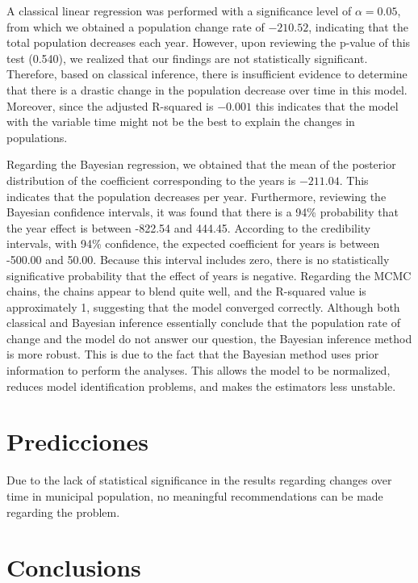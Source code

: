 \documentclass{article}
\begin{document}
A classical linear regression was performed with a significance level of $\alpha = 0.05$, from which we obtained a population change rate of $-210.52$, indicating that the total population decreases each year. However, upon reviewing the p-value of this test (0.540), we realized that our findings are not statistically significant. Therefore, based on classical inference, there is insufficient evidence to determine that there is a drastic change in the population decrease over time in this model. Moreover, since the adjusted R-squared is $-0.001$ this indicates that the model with the variable time might not be the best to explain the changes in populations.

Regarding the Bayesian regression, we obtained that the mean of the posterior distribution of the coefficient corresponding to the years is $-211.04$. This indicates that the population decreases per year. Furthermore, reviewing the Bayesian confidence intervals, it was found that there is a 94\% probability that the year effect is between -822.54 and 444.45. According to the credibility intervals, with 94\% confidence, the expected coefficient for years is between -500.00 and 50.00. Because this interval includes zero, there is no statistically significative probability that the effect of years is negative. Regarding the MCMC chains, the chains appear to blend quite well, and the R-squared value is approximately 1, suggesting that the model converged correctly. Although both classical and Bayesian inference essentially conclude that the population rate of change and the model do not answer our question, the Bayesian inference method is more robust. This is due to the fact that the Bayesian method uses prior information to perform the analyses. This allows the model to be normalized, reduces model identification problems, and makes the estimators less unstable.


\section{Predicciones}

Due to the lack of statistical significance in the results regarding changes over time in municipal population, no meaningful recommendations can be made regarding the problem.



\section{Conclusions}
\end{document}
